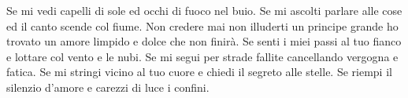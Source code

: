 \beginverse
Se mi vedi capelli di sole
ed occhi di fuoco nel buio.
Se mi ascolti parlare alle cose
ed il canto scende col fiume.
\endverse
\beginchorus
Non credere mai non illuderti
un principe grande ho trovato
un amore limpido e dolce che non finirà.
\endchorus
\beginverse
Se senti i miei passi al tuo fianco
e lottare col vento e le nubi.
Se mi segui per strade fallite
cancellando vergogna e fatica.
Se mi stringi vicino al tuo cuore
e chiedi il segreto alle stelle.
Se riempi il silenzio d'amore
e carezzi di luce i confini.
\endverse
\endsong
